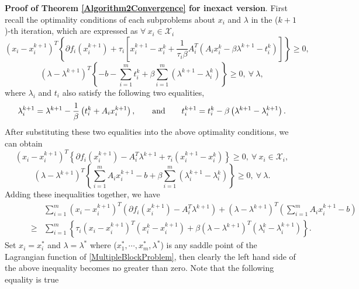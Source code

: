 \documentclass{mcom-l}
\theoremstyle{definition}
\theoremstyle{remark}
\numberwithin{equation}{section}
\begin{document}
{\bf{Proof of Theorem \ref{Algorithm2Convergence} for inexact version}}. First recall the optimality conditions of each subproblems about $x_i$ and $\lambda$ in the ($k+1$)-th iteration, which are expressed as $\forall\ x_i\in {\mathcal{X}}_i$
$$
\left(x_i - x_i^{k+1}\right)^T \!\!\left\{ \partial f_i (x_i^{k+1}) + \tau_i \left[ x_i^{k+1} - x_i^k + \frac{1}{\tau_i \beta} A_i^T \left( A_i x_i^k - \beta \lambda^{k+1} - t_i^k \right) \right] \right\}\ge 0,
$$
$$
\left( \lambda - \lambda^{k+1} \right)^T \left\{ -b - \sum\limits_{i=1}^m t_i^k + \beta \sum\limits_{i=1}^m \left( \lambda^{k+1} - \lambda_i^k \right) \right\}\ge 0,\ \forall\  \lambda,
$$
where $\lambda_i$ and $t_i$ also satisfy the following two equalities,
\begin{align}\label{eq:AppEquality}
\lambda_i^{k+1} = \lambda^{k+1} - \frac{1}{\beta} \left( t_i^k + A_i x_i^{k+1}\right),\qquad \hbox{and}\qquad t_i^{k+1} = t_i^k - \beta \left(\lambda^{k+1} - \lambda_i^{k+1}\right).
\end{align}
After substituting these two equalities into the above optimality conditions, we can obtain
\begin{equation}\label{DualSplitOptimalityx}
\left(x_i - x_i^{k+1}\right)^T \left\{ \partial f_i (x_i^{k+1}) - A_i^T \lambda^{k+1} + \tau_i \left( x_i^{k+1} - x_i^k \right) \right\}\ge 0,\ \forall\ x_i\in {\mathcal{X}}_i,
\end{equation}
\begin{equation}\label{DualSplitOptimalitylambda}
\left( \lambda - \lambda^{k+1} \right)^T \left\{ \sum\limits_{i=1}^m A_i x_i^{k+1} - b + \beta \sum\limits_{i=1}^m \left( \lambda_i^{k+1} - \lambda_i^k \right) \right\}\ge 0,\ \forall\  \lambda.
\end{equation}
Adding these inequalities together, we have
\begin{eqnarray}\label{AppendixOptimality}
\qquad&&\!\!\!\!\sum_{i=1}^m \left(x_i - x_i^{k+1}\right)^T \left( \partial f_i (x_i^{k+1}) - A_i^T \lambda^{k+1} \right) + \left( \lambda - \lambda^{k+1} \right)^T \left( \sum\limits_{i=1}^m A_i x_i^{k+1} \!-\! b \right)\nonumber\\
\qquad&\ge&\!\!\!\! \sum_{i=1}^m \left\{ \tau_i \left(x_i - x_i^{k+1}\right)^T \left( x_i^k - x_i^{k+1} \right) + \beta \left( \lambda - \lambda^{k+1} \right)^T \left( \lambda_i^k - \lambda_i^{k+1} \right) \right\}.
\end{eqnarray}
Set $x_i = x_i^*$ and $\lambda = \lambda^*$ where ($x_1^*,\cdots,x_m^*,\lambda^*$) is any saddle point of the Lagrangian function of \eqref{MultipleBlockProblem}, then clearly the left hand side of the above inequality becomes no greater than zero. Note that the following equality is true
\end{document}
